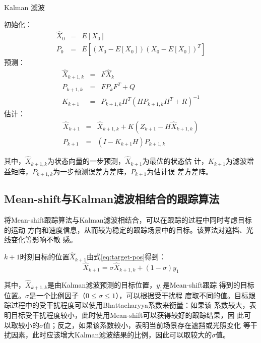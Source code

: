 \begin{algorithm}[htbp]
  \caption{Kalman 滤波}
  \label{alg:kalman}
  \begin{algorithmic}[1]
    \STATE 初始化：
    \begin{eqnarray*}
      \hat{X}_0&=&E[X_0]\\
      P_0&=&E[(X_0-E[X_0])(X_0-E[X_0])^{T}]
    \end{eqnarray*}
    \STATE 预测：
    \begin{eqnarray*}
      \hat{X}_{k+1,k}&=&F \hat{X}_{k}\\ 
      P_{k+1,k}&=&F P_{k}F^{T}+Q\\
      K_{k+1}&=&P_{k+1,k}H^{T}(H P_{k+1,k}H^{T}+R)^{-1}
    \end{eqnarray*}
    \STATE 估计：
    \begin{eqnarray*}
      \hat{X}_{k+1}&=&\hat{X}_{k+1,k}+K(Z_{k+1}-H\hat{X}_{k+1,k})\\
      P_{k+1}&=&(I-K_{k+1}H)P_{k+1,k}
    \end{eqnarray*}
  \end{algorithmic}
\end{algorithm}

其中，$\hat{X}_{k+1, k}$为状态向量的一步预测，$\hat{X}_{k+1}$为最优的状态估
计，$K_{k+1}$为滤波增益矩阵，$P_{k+1, k}$为一步预测误差方差阵，$P_{k+1}$为估计误
差方差阵。

\subsection{Mean-shift与Kalman滤波相结合的跟踪算法}
\label{sec:combine}

将Mean-shift跟踪算法与Kalman滤波相结合，可以在跟踪的过程中同时考虑目标的运动
方向和速度信息，从而较为稳定的跟踪场景中的目标。该算法对遮挡、光线变化等影响不敏
感。

$k+1$时刻目标的位置$\hat{X}_{k+1}$由式\ref{eq:target-pos}得到：
\begin{equation}
  \label{eq:target-pos}
  \hat{X}_{k+1}=\sigma \hat{X}_{k+1,k}+(1-\sigma)y_1
\end{equation}

其中，$\hat{X}_{k+1,k}$是由Kalman滤波预测的目标位置，$y_1$是Mean-shift跟踪
得到的目标位置。$\sigma$是一个比例因子（$0 \le \sigma \le 1$），可以根据受干扰程
度取不同的值。目标跟踪过程中的受干扰程度可以使用Bhattacharyya系数来衡量：如果该
系数较大，表明目标受干扰程度较小，此时使用Mean-shift可以获得较好的跟踪结果，因
此可以取较小的$\sigma$值；反之，如果该系数较小，表明当前场景存在遮挡或光照变化
等干扰因素，此时应该增大Kalman滤波结果的比例，因此可以取较大的$\sigma$值。

